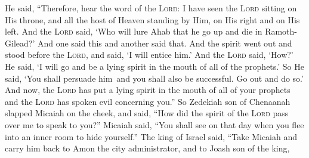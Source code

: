 \begin{inparaenum}
     He said, ``Therefore, hear the word of the \textsc{Lord}: I have seen the \textsc{Lord} sitting on His throne, and all the host of Heaven standing by Him, on His right and on His left.%
     And the \textsc{Lord} said, `Who will lure Ahab that he go up and die in Ramoth-Gilead?' And one said this and another said that.%
     And the spirit went out and stood before the \textsc{Lord}, and said, `I will entice him.' And the \textsc{Lord} said, `How?'%
     He said, `I will go and be a lying spirit in the mouth of all of the prophets.' So He said, `You shall persuade him\understood\ and you shall also be successful. Go out and do so.'%
     And now, the \textsc{Lord} has put a lying spirit in the mouth of all of your prophets and the \textsc{Lord} has spoken evil concerning you.''%
     So Zedekiah son of Chenaanah slapped Micaiah on the cheek, and said, ``How did the spirit of the \textsc{Lord} pass over me to speak to you?''%
     Micaiah said, ``You shall see on that day when you flee into an inner room to hide yourself.''%
     The king of Israel said, ``Take Micaiah and carry him back to Amon the city administrator, and to Joash son of the king,%

\end{inparaenum}

